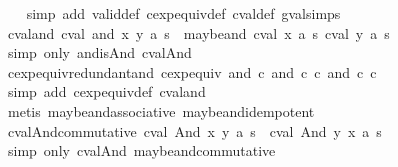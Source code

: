 \begin{isabellebody}
%
\isadelimproof
\ \ %
\endisadelimproof
%
\isatagproof
{}\isamarkupfalse%
\ {\isacharparenleft}simp\ add{\isacharcolon}\ valid{\isacharunderscore}def\ cexp{\isacharunderscore}equiv{\isacharunderscore}def\ cval{\isacharunderscore}def\ gval{\isachardot}simps{\isacharparenright}%
\endisatagproof
{\isafoldproof}%
%
\isadelimproof
\isanewline
%
\endisadelimproof
\isanewline
{}\isamarkupfalse%
\ cval{\isacharunderscore}and{\isacharcolon}\ {\isachardoublequoteopen}cval\ {\isacharparenleft}and\ x\ y{\isacharparenright}\ a\ s\ {\isacharequal}\ maybe{\isacharunderscore}and\ {\isacharparenleft}cval\ x\ a\ s{\isacharparenright}\ {\isacharparenleft}cval\ y\ a\ s{\isacharparenright}{\isachardoublequoteclose}\isanewline
%
\isadelimproof
\ \ %
\endisadelimproof
%
\isatagproof
{}\isamarkupfalse%
\ {\isacharparenleft}simp\ only{\isacharcolon}\ and{\isacharunderscore}is{\isacharunderscore}And\ cval{\isacharunderscore}And{\isacharparenright}%
\endisatagproof
{\isafoldproof}%
%
\isadelimproof
\isanewline
%
\endisadelimproof
\isanewline
{}\isamarkupfalse%
\ cexp{\isacharunderscore}equiv{\isacharunderscore}redundant{\isacharunderscore}and{\isacharcolon}\ {\isachardoublequoteopen}cexp{\isacharunderscore}equiv\ {\isacharparenleft}and\ c\ {\isacharparenleft}and\ c\ c{\isacharprime}{\isacharparenright}{\isacharparenright}\ {\isacharparenleft}and\ c\ c{\isacharprime}{\isacharparenright}{\isachardoublequoteclose}\isanewline
%
\isadelimproof
\ \ %
\endisadelimproof
%
\isatagproof
{}\isamarkupfalse%
\ {\isacharparenleft}simp\ add{\isacharcolon}\ cexp{\isacharunderscore}equiv{\isacharunderscore}def\ cval{\isacharunderscore}and{\isacharparenright}\isanewline
\ \ \isamarkupfalse%
\ {\isacharparenleft}metis\ maybe{\isacharunderscore}and{\isacharunderscore}associative\ maybe{\isacharunderscore}and{\isacharunderscore}idempotent{\isacharparenright}%
\endisatagproof
{\isafoldproof}%
%
\isadelimproof
\isanewline
%
\endisadelimproof
\isanewline
{}\isamarkupfalse%
\ cval{\isacharunderscore}And{\isacharunderscore}commutative{\isacharcolon}\ {\isachardoublequoteopen}cval\ {\isacharparenleft}And\ x\ y{\isacharparenright}\ a\ s\ {\isacharequal}\ cval\ {\isacharparenleft}And\ y\ x{\isacharparenright}\ a\ s{\isachardoublequoteclose}\isanewline
%
\isadelimproof
\ \ %
\endisadelimproof
%
\isatagproof
{}\isamarkupfalse%
\ {\isacharparenleft}simp\ only{\isacharcolon}\ cval{\isacharunderscore}And\ maybe{\isacharunderscore}and{\isacharunderscore}commutative{\isacharparenright}%
\endisatagproof

\end{isabellebody}
